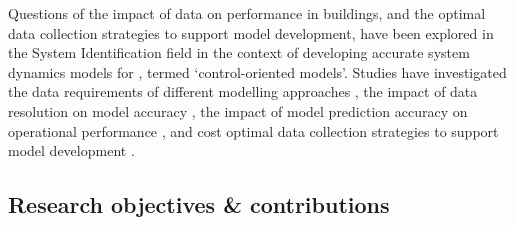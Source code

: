 Questions of the impact of data on  performance in buildings, and the optimal data collection strategies to support model development, have been explored in the System Identification field \citep{zhan2021DataRequirementsPerformance,balali2023EnergyModellingControl,zhang2023InvestigationsMachineLearningbased,erfani2023LinkingDatasetQuality,zhan2022ImpactOccupantRelated,zhan2022ModelcentricDatacentricPractical} in the context of developing accurate system dynamics models for , termed `control-oriented models'. Studies have investigated the data requirements of different modelling approaches \citep{zhan2021DataRequirementsPerformance,balali2023EnergyModellingControl,zhang2023InvestigationsMachineLearningbased}, the impact of data resolution on model accuracy \citep{erfani2023LinkingDatasetQuality}, the impact of model prediction accuracy on operational performance \citep{zhan2022ImpactOccupantRelated}, and cost optimal data collection strategies to support model development \citep{zhan2022ModelcentricDatacentricPractical}.


\newpage
\subsection{Research objectives \& contributions}

